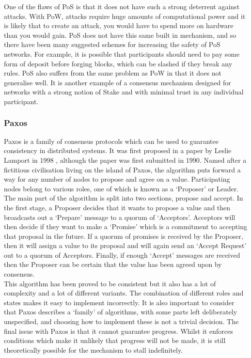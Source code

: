 \documentclass[12pt,a4paper,twoside,openright]{report}
\begin{document}
			One of the flaws of PoS is that it does not have such a strong deterrent against attacks.
			With PoW, attacks require huge amounts of computational power and it is likely that to create an attack, you would have to spend more on hardware than you would gain. 
			PoS does not have this same built in mechanism, and so there have been many suggested schemes for increasing the safety of PoS networks.
			For example, it is possible that participants should need to pay some form of deposit before forging blocks, which can be slashed if they break any rules. 
			PoS also suffers from the same problem as PoW in that it does not generalise well. 
			It is another example of a consensus mechanism designed for networks with a strong notion of Stake and with minimal trust in any individual participant.

			\subsubsection*{Paxos}
			Paxos is a family of consensus protocols which can be used to guarantee consistency in distributed systems. 
			It was first proposed in a paper by Leslie Lamport in 1998 \cite{Paxos}, although the paper was first submitted in 1990.
			Named after a fictitious civilisation living on the island of Paxos, the algorithm puts forward a way for any number of nodes to propose and agree on a value.
			Participating nodes belong to various roles, one of which is known as a `Proposer' or Leader.\\

			The main part of the algorithm is split into two sections, propose and accept.
			In the first stage, a Proposer decides that it wants to propose a value and then broadcasts out a `Prepare' message to a quorum of `Acceptors'.
			Acceptors will then decide if they want to make a `Promise' which is a commitment to accepting that proposal in the future. 
			If a quorum of promises is received by the Proposer, then it will assign a value to its proposal and will again send an `Accept Request' out to a quorum of Acceptors.
			Finally, if enough `Accept' messages are received then the Proposer can be certain that the value has been agreed upon by consensus.\\

			This algorithm has been proved to be consistent but it also has a lot of complexity and a lot of different variants. 
			The combination of different roles and states makes it easy to implement incorrectly.
			It is also important to consider that Paxos describes a `family' of algorithms, with some parts left deliberately unspecified, and choosing how to implement these is not a trivial decision.
			The final issue with Paxos is that it cannot guarantee progress.
			Whilst it enforces conditions which make it unlikely that progress will not be made, it is still theoretically possible for the mechanism to stall indefinitely.
\end{document}
